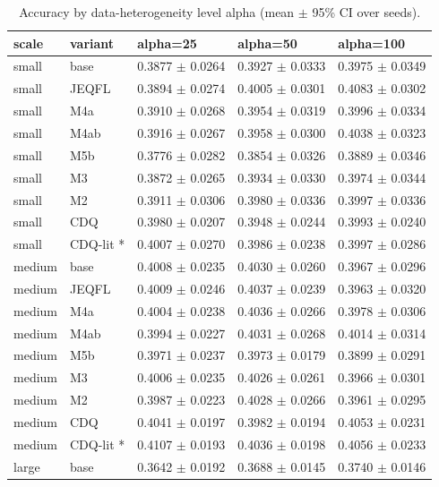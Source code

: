 \begin{table}[t]\centering\footnotesize
\caption{Accuracy by data-heterogeneity level alpha (mean $\pm$ 95\% CI over seeds).}\label{tab:table4_accuracy_by_alpha}
\begin{tabular}{lllll}
\toprule
scale & variant & alpha=25 & alpha=50 & alpha=100 \\
\midrule
small & base & 0.3877 $\pm$ 0.0264 & 0.3927 $\pm$ 0.0333 & 0.3975 $\pm$ 0.0349 \\
small & JEQFL & 0.3894 $\pm$ 0.0274 & 0.4005 $\pm$ 0.0301 & 0.4083 $\pm$ 0.0302 \\
small & M4a & 0.3910 $\pm$ 0.0268 & 0.3954 $\pm$ 0.0319 & 0.3996 $\pm$ 0.0334 \\
small & M4ab & 0.3916 $\pm$ 0.0267 & 0.3958 $\pm$ 0.0300 & 0.4038 $\pm$ 0.0323 \\
small & M5b & 0.3776 $\pm$ 0.0282 & 0.3854 $\pm$ 0.0326 & 0.3889 $\pm$ 0.0346 \\
small & M3 & 0.3872 $\pm$ 0.0265 & 0.3934 $\pm$ 0.0330 & 0.3974 $\pm$ 0.0344 \\
small & M2 & 0.3911 $\pm$ 0.0306 & 0.3980 $\pm$ 0.0336 & 0.3997 $\pm$ 0.0336 \\
small & CDQ & 0.3980 $\pm$ 0.0207 & 0.3948 $\pm$ 0.0244 & 0.3993 $\pm$ 0.0240 \\
small & CDQ-lit * & 0.4007 $\pm$ 0.0270 & 0.3986 $\pm$ 0.0238 & 0.3997 $\pm$ 0.0286 \\
medium & base & 0.4008 $\pm$ 0.0235 & 0.4030 $\pm$ 0.0260 & 0.3967 $\pm$ 0.0296 \\
medium & JEQFL & 0.4009 $\pm$ 0.0246 & 0.4037 $\pm$ 0.0239 & 0.3963 $\pm$ 0.0320 \\
medium & M4a & 0.4004 $\pm$ 0.0238 & 0.4036 $\pm$ 0.0266 & 0.3978 $\pm$ 0.0306 \\
medium & M4ab & 0.3994 $\pm$ 0.0227 & 0.4031 $\pm$ 0.0268 & 0.4014 $\pm$ 0.0314 \\
medium & M5b & 0.3971 $\pm$ 0.0237 & 0.3973 $\pm$ 0.0179 & 0.3899 $\pm$ 0.0291 \\
medium & M3 & 0.4006 $\pm$ 0.0235 & 0.4026 $\pm$ 0.0261 & 0.3966 $\pm$ 0.0301 \\
medium & M2 & 0.3987 $\pm$ 0.0223 & 0.4028 $\pm$ 0.0266 & 0.3961 $\pm$ 0.0295 \\
medium & CDQ & 0.4041 $\pm$ 0.0197 & 0.3982 $\pm$ 0.0194 & 0.4053 $\pm$ 0.0231 \\
medium & CDQ-lit * & 0.4107 $\pm$ 0.0193 & 0.4036 $\pm$ 0.0198 & 0.4056 $\pm$ 0.0233 \\
large & base & 0.3642 $\pm$ 0.0192 & 0.3688 $\pm$ 0.0145 & 0.3740 $\pm$ 0.0146 \\

\end{tabular}
\end{table}
